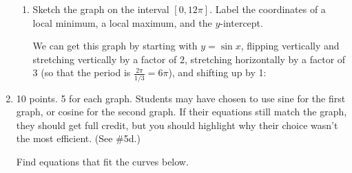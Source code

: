 \documentclass{article}
\begin{document}
\begin{enumerate}[topsep=0pt]
\begin{enumerate}
\item
\begin{problem}[\stretch{3}]
    Sketch the graph on the interval $[0, 12 \pi]$.  Label the coordinates of a local
    minimum, a local maximum, and the $y$-intercept.
  \end{problem}

  \begin{solution}
    We can get this graph by starting with $y = \sin x$, flipping
    vertically and stretching vertically by a factor of $2$, stretching
    horizontally by a factor of $3$ (so that the period is $\frac{2
      \pi}{1/3} = 6 \pi$), and shifting up by 1:
    \begin{center}
    \end{center}
  \end{solution}

\end{enumerate}
\item 

\begin{grading}
10 points. 5 for each graph. Students may have chosen to use sine for the first graph, or cosine for the second graph. If their equations still match the graph, they should get full credit, but you should highlight why their choice wasn't the most efficient. (See \#5d.)
\end{grading}

Find equations that fit the curves below.


  \begin{multicols}{2}
    \begin{enumerate}


\end{enumerate}
\end{multicols}
\end{enumerate}
\end{document}
